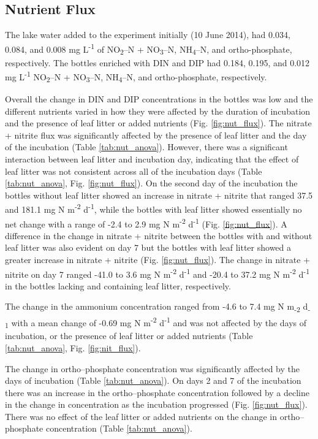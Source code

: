 
\subsection{Nutrient Flux}

The lake water added to the experiment initially (10 June 2014), had 0.034, 0.084, and 0.008 mg L\textsuperscript{-1} of NO\textsubscript{2}--N + NO\textsubscript{3}--N, NH\textsubscript{4}--N, and ortho-phosphate, respectively. The bottles enriched with DIN and DIP had 0.184, 0.195, and 0.012 mg L\textsuperscript{-1} NO\textsubscript{2}--N + NO\textsubscript{3}--N, NH\textsubscript{4}--N, and ortho-phosphate, respectively.

Overall the change in DIN and DIP concentrations in the bottles was low and the different nutrients varied in how they were affected by the duration of incubation and the presence of leaf litter or added nutrients (Fig. \ref{fig:nut_flux}).  The nitrate + nitrite flux was significantly affected by the presence of leaf litter and the day of the incubation (Table \ref{tab:nut_anova}). However, there was a significant interaction between leaf litter and incubation day, indicating that the effect of leaf litter was not consistent across all of the incubation days (Table \ref{tab:nut_anova}, Fig. \ref{fig:nut_flux}). On the second day of the incubation the bottles without leaf litter showed an increase in nitrate + nitrite that ranged 37.5 and 181.1 mg N m\textsuperscript{-2} d\textsuperscript{-1}, while the bottles with leaf litter showed essentially no net change with a range of -2.4 to 2.9 mg N m\textsuperscript{-2} d\textsuperscript{-1} (Fig. \ref{fig:nut_flux}).  A difference in the change in nitrate + nitrite between the bottles with and without leaf litter was also evident on day 7 but the bottles with leaf litter showed a greater increase in nitrate + nitrite (Fig. \ref{fig:nut_flux}). The change in nitrate + nitrite on day 7 ranged -41.0 to 3.6 mg N m\textsuperscript{-2} d\textsuperscript{-1} and -20.4 to 37.2 mg N m\textsuperscript{-2} d\textsuperscript{-1} in the bottles lacking and containing leaf litter, respectively. 

The change in the ammonium concentration ranged from -4.6 to 7.4 mg N m\textsubscript{-2} d\textsubscript{-1} with a mean change of -0.69 mg N m\textsuperscript{-2} d\textsuperscript{-1} and was not affected by the days of incubation, or the presence of leaf litter or added nutrients (Table \ref{tab:nut_anova}, Fig. \ref{fig:nit_flux}).

The change in ortho--phosphate concentration was significantly affected by the days of incubation (Table \ref{tab:nut_anova}). On days 2 and 7 of the incubation there was an increase in the ortho--phosphate concentration followed by a decline in the change in concentration as the incubation progressed (Fig. \ref{fig:nut_flux}). There was no effect of the leaf litter or added nutrients on the change in ortho--phosphate concentration (Table \ref{tab:nut_anova}).

